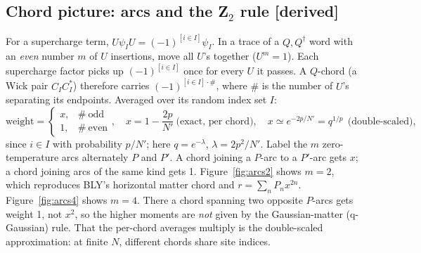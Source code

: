 \documentclass[11pt]{article}
\newcommand{\Np}{N'}
\newcommand{\tagbox}[2]{\textsf{\small\color{#1}[#2]}}
\newcommand{\DER}{\tagbox{cder}{derived}}
\theoremstyle{remark}
\begin{document}
\subsection{Chord picture: arcs and the Z$_2$ rule \DER}\label{sec:chords}
For a supercharge term, $U\psi_IU=(-1)^{[i\in I]}\psi_I$. In a trace of a $Q,Q^\dagger$ word with an \emph{even}
number $m$ of $U$ insertions, move all $U$'s together ($U^m=1$). Each supercharge factor picks up
$(-1)^{[i\in I]}$ once for every $U$ it passes. A $Q$-chord (a Wick pair $C_IC_I^*$) therefore carries
$(-1)^{[i\in I]\cdot\#}$, where $\#$ is the number of $U$'s separating its endpoints. Averaged over its random index
set $I$:
\begin{equation}
\text{weight}=\begin{cases}x, & \#\ \text{odd}\\ 1,&\#\ \text{even}\end{cases},\quad
x=1-\frac{2p}{\Np}\ \text{(exact, per chord)},\quad x\simeq e^{-2p/\Np}=q^{1/p}\ \ \text{(double-scaled)},
\end{equation}
since $i\in I$ with probability $p/\Np$; here $q=e^{-\lambda}$, $\lambda=2p^2/\Np$.
Label the $m$ zero-temperature arcs alternately $P$ and $P'$. A chord joining a $P$-arc to a $P'$-arc gets $x$; a
chord joining arcs of the same kind gets 1. Figure~\ref{fig:arcs2} shows $m=2$, which reproduces BLY's horizontal
matter chord and $r=\sum_nP_nx^{2n}$. Figure~\ref{fig:arcs4} shows $m=4$. There a chord spanning two opposite $P$-arcs
gets weight 1, not $x^2$, so the higher moments are \emph{not} given by the Gaussian-matter (q-Gaussian) rule. That
the per-chord averages multiply is the double-scaled approximation: at finite $N$, different chords share site
indices.
\end{document}
